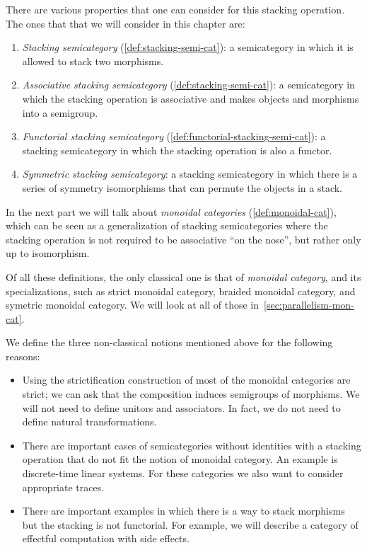 There are various properties that one can consider for this stacking operation.
The ones that that we will consider in this chapter are:
%
\begin{enumerate}
    \item \emph{Stacking semicategory} (\cref{def:stacking-semi-cat}): a semicategory in which  it is allowed to stack two morphisms.
    \item \emph{Associative stacking semicategory} (\cref{def:stacking-semi-cat}): a semicategory in which the stacking operation is associative and makes objects and morphisms into a semigroup.
    \item \emph{Functorial stacking semicategory} (\cref{def:functorial-stacking-semi-cat}): a stacking semicategory in which the stacking operation is also a functor.
    \item \emph{Symmetric stacking semicategory}: a stacking semicategory in which there is a series of symmetry isomorphisms that can permute the objects in a stack.
\end{enumerate}
%
In the next part we will talk about \emph{monoidal categories} (\cref{def:monoidal-cat}), which can be seen as a generalization of stacking semicategories where the stacking operation is not required to be associative ``on the nose'', but rather only up to isomorphism.

\begin{remark}
    Of all these definitions, the only classical one is that of \emph{monoidal category}, and its specializations, such as strict monoidal category, braided monoidal category, and symetric monoidal category.
    We will look at all of those in~\cref{sec:parallelism-mon-cat}.

    We define the three non-classical notions mentioned above for the following reasons:
    \begin{itemize}
        \item Using the strictification construction of \SetL most of the monoidal categories are strict; we can ask that the composition induces semigroups of morphisms.
              We will not need to define unitors and associators.
              In fact, we do not need to define natural transformations.
        \item There are important cases of semicategories without identities with a stacking operation that do not fit the notion of monoidal category.
              An example is discrete-time linear systems.
              For these categories we also want to consider appropriate traces.
        \item There are important examples in which there is a way to stack morphisms but the stacking is not functorial.
              For example, we will describe a category of effectful computation with side effects.
    \end{itemize}
\end{remark}

